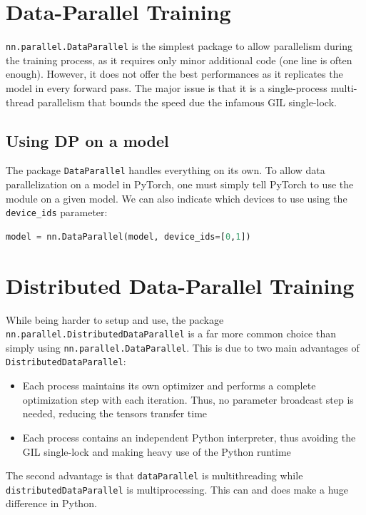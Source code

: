\documentclass{article}
\begin{document}
\section{Data-Parallel Training}
\lstinline{nn.parallel.DataParallel} is the simplest package to allow parallelism during the training process, as it requires only minor additional code (one line is often enough). However, it does not offer the best performances as it replicates the model in every forward pass. The major issue is that it is a single-process multi-thread parallelism that bounds the speed due the infamous \Gls{GIL} single-lock.

\subsection{Using DP on a model}
The package \lstinline{DataParallel} handles everything on its own. To allow data parallelization on a model in PyTorch, one must simply tell PyTorch to use the module on a given model. We can also indicate which devices to use using the \lstinline{device_ids} parameter:

\begin{lstlisting}[language=Python]
model = nn.DataParallel(model, device_ids=[0,1])
\end{lstlisting}

\section{Distributed Data-Parallel Training}
While being harder to setup and use, the package \lstinline{nn.parallel.DistributedDataParallel} is a far more common choice than simply using \lstinline{nn.parallel.DataParallel}. This is due to two main advantages of \lstinline{DistributedDataParallel}:
\begin{itemize}
  \item Each process maintains its own optimizer and performs a complete optimization step with each iteration. Thus, no parameter broadcast step is needed, reducing the tensors transfer time
  \item Each process contains an independent Python interpreter, thus avoiding the GIL single-lock and making heavy use of the Python runtime
\end{itemize}

The second advantage is that \lstinline{dataParallel} is \gls{multithreading} while \lstinline{distributedDataParallel} is \gls{multiprocessing}. This can and does make a huge difference in Python.
\end{document}
